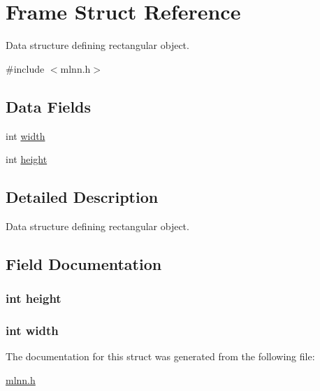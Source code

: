 \hypertarget{struct_frame}{}\section{Frame Struct Reference}
\label{struct_frame}


Data structure defining rectangular object.  




{\ttfamily \#include $<$mlnn.\+h$>$}

\subsection*{Data Fields}
\begin{DoxyCompactItemize}
\item 
int \hyperlink{struct_frame_a2474a5474cbff19523a51eb1de01cda4}{width}
\item 
int \hyperlink{struct_frame_ad12fc34ce789bce6c8a05d8a17138534}{height}
\end{DoxyCompactItemize}


\subsection{Detailed Description}
Data structure defining rectangular object. 

\subsection{Field Documentation}
\hypertarget{struct_frame_ad12fc34ce789bce6c8a05d8a17138534}{}
\subsubsection[{height}]{\setlength{\rightskip}{0pt plus 5cm}int height}\label{struct_frame_ad12fc34ce789bce6c8a05d8a17138534}
\hypertarget{struct_frame_a2474a5474cbff19523a51eb1de01cda4}{}
\subsubsection[{width}]{\setlength{\rightskip}{0pt plus 5cm}int width}\label{struct_frame_a2474a5474cbff19523a51eb1de01cda4}


The documentation for this struct was generated from the following file\+:\begin{DoxyCompactItemize}
\item 
\hyperlink{mlnn_8h}{mlnn.\+h}\end{DoxyCompactItemize}
